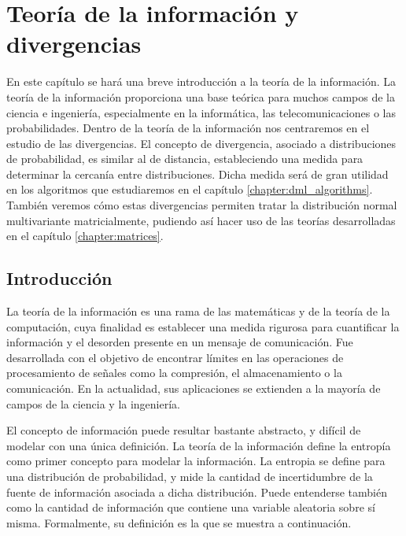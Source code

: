 \chapter{Teoría de la información y divergencias}

En este capítulo se hará una breve introducción a la teoría de la información. La teoría de la información proporciona una base teórica para muchos campos de la ciencia e ingeniería, especialmente en la informática, las telecomunicaciones o las probabilidades. Dentro de la teoría de la información nos centraremos en el estudio de las divergencias. El concepto de divergencia, asociado a distribuciones de probabilidad, es similar al de distancia, estableciendo una medida para determinar la cercanía entre distribuciones. Dicha medida será de gran utilidad en los algoritmos que estudiaremos en el capítulo \ref{chapter:dml_algorithms}. También veremos cómo estas divergencias permiten tratar la distribución normal multivariante matricialmente, pudiendo así hacer uso de las teorías desarrolladas en el capítulo \ref{chapter:matrices}.

\section{Introducción}

La teoría de la información es una rama de las matemáticas y de la teoría de la computación, cuya finalidad es establecer una medida rigurosa para cuantificar la información y el desorden presente en un mensaje de comunicación. Fue desarrollada con el objetivo de encontrar límites en las operaciones de procesamiento de señales como la compresión, el almacenamiento o la comunicación. En la actualidad, sus aplicaciones se extienden a la mayoría de campos de la ciencia y la ingeniería.

El concepto de información puede resultar bastante abstracto, y difícil de modelar con una única definición. La teoría de la información define la entropía como primer concepto para modelar la información. La entropia se define para una distribución de probabilidad, y mide la cantidad de incertidumbre de la fuente de información asociada a dicha distribución. Puede entenderse también como la cantidad de información que contiene una variable aleatoria sobre sí misma. Formalmente, su definición es la que se muestra a continuación.


